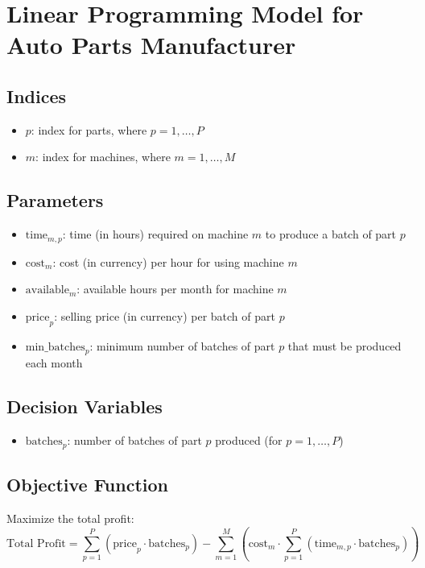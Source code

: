 \documentclass{article}
\begin{document}
\section*{Linear Programming Model for Auto Parts Manufacturer}

\subsection*{Indices}
\begin{itemize}
    \item \( p \): index for parts, where \( p = 1, \ldots, P \)
    \item \( m \): index for machines, where \( m = 1, \ldots, M \)
\end{itemize}

\subsection*{Parameters}
\begin{itemize}
    \item \( \text{time}_{m,p} \): time (in hours) required on machine \( m \) to produce a batch of part \( p \)
    \item \( \text{cost}_{m} \): cost (in currency) per hour for using machine \( m \)
    \item \( \text{available}_{m} \): available hours per month for machine \( m \)
    \item \( \text{price}_{p} \): selling price (in currency) per batch of part \( p \)
    \item \( \text{min\_batches}_{p} \): minimum number of batches of part \( p \) that must be produced each month
\end{itemize}

\subsection*{Decision Variables}
\begin{itemize}
    \item \( \text{batches}_{p} \): number of batches of part \( p \) produced (for \( p = 1, \ldots, P \))
\end{itemize}

\subsection*{Objective Function}
Maximize the total profit:
\[
\text{Total Profit} = \sum_{p=1}^{P} (\text{price}_{p} \cdot \text{batches}_{p}) - \sum_{m=1}^{M} \left( \text{cost}_{m} \cdot \sum_{p=1}^{P} (\text{time}_{m,p} \cdot \text{batches}_{p}) \right)
\]
\end{document}
